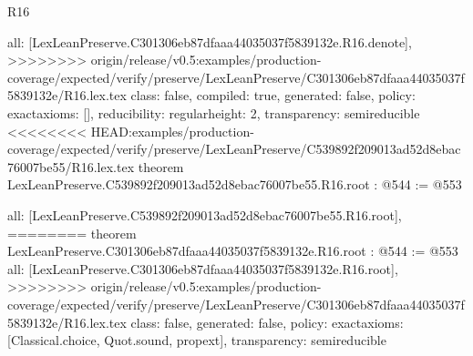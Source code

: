 \begin{lexlean}{R16}
\begin{coremodule}
{{{{{  all: [LexLeanPreserve.C301306eb87dfaaa44035037f5839132e.R16.denote],
>>>>>>>> origin/release/v0.5:examples/production-coverage/expected/verify/preserve/LexLeanPreserve/C301306eb87dfaaa44035037f5839132e/R16.lex.tex
  class: false,
  compiled: true,
  generated: false,
  policy: exact{axioms: []},
  reducibility: regular{height: 2},
  transparency: semireducible
}
<<<<<<<< HEAD:examples/production-coverage/expected/verify/preserve/LexLeanPreserve/C539892f209013ad52d8ebac76007be55/R16.lex.tex
theorem LexLeanPreserve.C539892f209013ad52d8ebac76007be55.R16.root : @544 := @553 {
  all: [LexLeanPreserve.C539892f209013ad52d8ebac76007be55.R16.root],
========
theorem LexLeanPreserve.C301306eb87dfaaa44035037f5839132e.R16.root : @544 := @553 {
  all: [LexLeanPreserve.C301306eb87dfaaa44035037f5839132e.R16.root],
>>>>>>>> origin/release/v0.5:examples/production-coverage/expected/verify/preserve/LexLeanPreserve/C301306eb87dfaaa44035037f5839132e/R16.lex.tex
  class: false,
  generated: false,
  policy: exact{axioms: [Classical.choice, Quot.sound, propext]},
  transparency: semireducible
}

}}}}}
\end{coremodule}
\end{lexlean}

